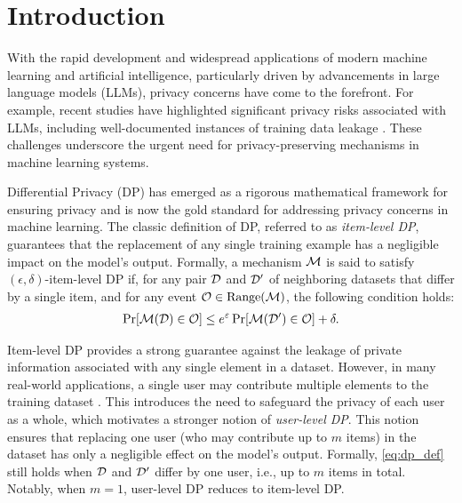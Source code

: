 \section{Introduction}
With the rapid development and widespread applications of modern machine learning and artificial intelligence, particularly driven by advancements in large language models (LLMs), privacy concerns have come to the forefront. 
For example, recent studies have highlighted significant privacy risks associated with LLMs, including well-documented instances of training data leakage \citep{carlini2021extracting,lukas2023analyzing}. These challenges underscore the urgent need for privacy-preserving mechanisms in machine learning systems.

Differential Privacy (DP) \citep{dwork2006calibrating} has emerged as a rigorous mathematical framework for ensuring privacy and is now the gold standard for addressing privacy concerns in machine learning. The classic definition of DP, referred to as \textit{item-level DP}, guarantees that the replacement of any single training example has a negligible impact on the model’s output. Formally, a mechanism $\mathcal{M}$ is said to satisfy $(\epsilon,\delta)$-item-level DP if, for any pair $\mathcal{D}$ and $\mathcal{D}'$ of neighboring datasets that differ by a single item, and for any event $\mathcal{O} \in \mathrm{Range}(\mathcal{M})$, the following condition holds: \begin{align} \label{eq:dp_def} \Pr[\mathcal{M}(\mathcal{D}) \in \mathcal{O}] \leq e^{\varepsilon} \Pr[\mathcal{M}(\mathcal{D}') \in \mathcal{O}] + \delta. \end{align}

Item-level DP provides a strong guarantee against the leakage of private information associated with any single element in a dataset. 
However, in many real-world applications, a single user may contribute multiple elements to the training dataset \citep{Xu2024}. 
This introduces the need to safeguard the privacy of each user as a whole, which motivates a stronger notion of \textit{user-level DP}.  This notion ensures that replacing one user (who may contribute up to $m$ items) in the dataset has only a negligible effect on the model’s output. 
Formally, \eqref{eq:dp_def} still holds when $\mathcal{D}$ and $\mathcal{D}'$ differ by one user, i.e., up to $m$ items in total. Notably, when $m = 1$, user-level DP reduces to item-level DP.

